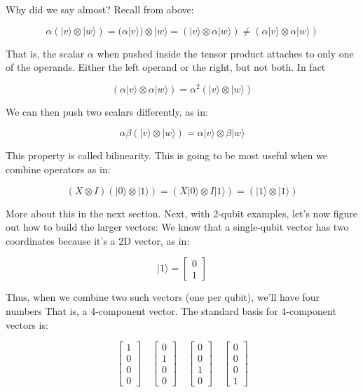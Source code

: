 \documentclass[main.tex]{subfiles}
\begin{document}
    Why did we say almost? Recall from above:
    
    $$
    \alpha(|v\rangle \otimes|w\rangle)=(\alpha|v\rangle) \otimes|w\rangle=(|v\rangle \otimes \alpha|w\rangle) \neq(\alpha|v\rangle \otimes \alpha|w\rangle)
    $$
    
    That is, the scalar $\alpha$ when pushed inside the tensor product attaches to only one of the operands. Either the left operand or the right, but not both. In fact
    
    $$
    (\alpha|v\rangle \otimes \alpha|w\rangle)=\alpha^{2}(|v\rangle \otimes|w\rangle)
    $$
    
    We can then push two scalars differently, as in:
    
    $$
    \alpha \beta(|v\rangle \otimes|w\rangle)=\alpha|v\rangle \otimes \beta|w\rangle
    $$
    
    This property is called bilinearity. This is going to be most useful when we combine operators as in:
    
    $$
    (X \otimes I)(|0\rangle \otimes|1\rangle)=(X|0\rangle \otimes I|1\rangle)=(|1\rangle \otimes|1\rangle)
    $$
    
    More about this in the next section. Next, with 2-qubit examples, let's now figure out how to build the larger vectors: We know that a single-qubit vector has two coordinates because it's a 2D vector, as in:
    
    $$
    |1\rangle=\left[\begin{array}{l}
    0 \\
    1
    \end{array}\right]
    $$
    
    Thus, when we combine two such vectors (one per qubit), we'll have four numbers That is, a 4-component vector. The standard basis for 4-component vectors is:
    
    $$
    \left[\begin{array}{l}
    1 \\
    0 \\
    0 \\
    0
    \end{array}\right] \quad\left[\begin{array}{l}
    0 \\
    1 \\
    0 \\
    0
    \end{array}\right] \quad\left[\begin{array}{l}
    0 \\
    0 \\
    1 \\
    0
    \end{array}\right] \quad\left[\begin{array}{l}
    0 \\
    0 \\
    0 \\
    1
    \end{array}\right]
    $$
    
\end{document}
